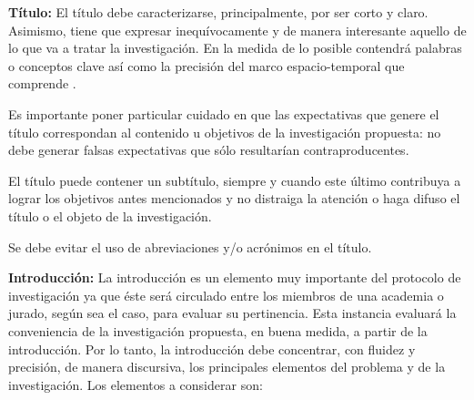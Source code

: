 \documentclass[10pt,a4paper]{protocol}
\begin{document}






\begin{fullwidth}
\makeheader
\end{fullwidth}

{\bf Título:} El título debe caracterizarse, principalmente, por ser corto y claro. Asimismo, tiene que  expresar inequívocamente y de manera interesante aquello de lo que va a tratar la investigación. En la medida de lo posible contendrá palabras o conceptos clave así como la precisión del marco espacio-temporal que comprende \cite{einstein}.\\ \vspace*{0.5cm}

Es importante poner particular cuidado en que las expectativas que genere el título correspondan al contenido u objetivos de la investigación propuesta: no debe generar falsas expectativas que sólo resultarían contraproducentes.\\ \vspace*{0.5cm}


El título puede contener un subtítulo, siempre y cuando este último contribuya a lograr los objetivos antes mencionados y no distraiga la atención o haga difuso el título o el objeto de la investigación.\\ \vspace*{0.5cm}


Se debe evitar el uso de abreviaciones y/o acrónimos en el título.\\ \vspace*{0.5cm}

\divider
{\bf Introducción:} La introducción es un elemento muy importante del protocolo de investigación ya que éste será circulado entre los miembros de una academia o jurado, según sea el caso, para evaluar su pertinencia. Esta instancia evaluará la conveniencia de la investigación propuesta, en buena medida, a partir de la introducción. Por lo tanto, la introducción debe concentrar, con fluidez y precisión, de manera discursiva, los principales elementos del problema y de la investigación. Los elementos a considerar son:\\ 
\end{document}
